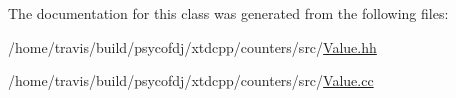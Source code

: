 The documentation for this class was generated from the following files\-:\begin{DoxyCompactItemize}
\item 
/home/travis/build/psycofdj/xtdcpp/counters/src/\hyperlink{Value_8hh}{Value.\-hh}\item 
/home/travis/build/psycofdj/xtdcpp/counters/src/\hyperlink{Value_8cc}{Value.\-cc}\end{DoxyCompactItemize}
